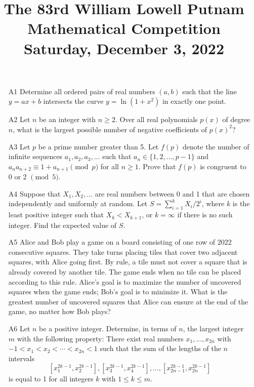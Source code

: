 \documentclass[amssymb,twocolumn,pra,10pt,aps,nofootinbib]{revtex4-1}
\begin{document}
\title{The 83rd William Lowell Putnam Mathematical Competition \\
    Saturday, December 3, 2022}
\maketitle

\begin{itemize}

\item[A1]
Determine all ordered pairs of real numbers $(a,b)$ such that the line $y = ax+b$ intersects the curve $y = \ln(1+x^2)$ in exactly one point.

\item[A2]
Let $n$ be an integer with $n \geq 2$. Over all real polynomials $p(x)$ of degree $n$, what is the largest possible number of negative coefficients of $p(x)^2$?

\item[A3]
Let $p$ be a prime number greater than 5. Let $f(p)$ denote the number of infinite sequences $a_1, a_2, a_3, \dots$ such that
$a_n \in \{1, 2, \dots, p-1\}$ and $a_n a_{n+2} \equiv 1 + a_{n+1} \pmod{p}$ for all $n \geq 1$. Prove that $f(p)$ is congruent to 0 or 2 $\pmod{5}$.

\item[A4]
Suppose that $X_1, X_2, \dots$ are real numbers between 0 and 1 that are chosen independently and uniformly at random. Let $S = \sum_{i=1}^k X_i/2^i$, where $k$ is the least positive integer such that $X_k < X_{k+1}$, or $k = \infty$ if there is no such integer. Find the expected value of $S$.
 
\item[A5]
Alice and Bob play a game on a board consisting of one row of 2022 consecutive squares. They take turns placing tiles that cover two adjacent squares, with Alice going first. By rule, a tile must not cover a square that is already covered by another tile. The game ends when no tile can be placed according to this rule. Alice's goal is to maximize the number of uncovered squares when the game ends; Bob's goal is to minimize it. What is the greatest number of uncovered squares that Alice can ensure at the end of the game, no matter how Bob plays?

\item[A6]
Let $n$ be a positive integer. Determine, in terms of $n$, the largest integer $m$ with the following property: There exist real numbers $x_1,\dots,x_{2n}$ with $-1 < x_1 < x_2 < \cdots < x_{2n} < 1$ such that the sum of the lengths of the $n$ intervals
\[
[x_1^{2k-1}, x_2^{2k-1}], [x_3^{2k-1},x_4^{2k-1}], \dots, [x_{2n-1}^{2k-1}, x_{2n}^{2k-1}]
\]
is equal to 1 for all integers $k$ with $1 \leq k \leq m$.


\end{itemize}
\end{document}
